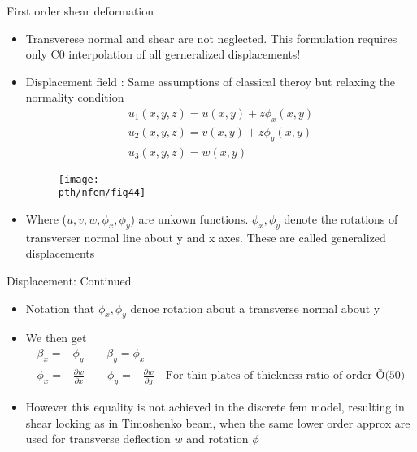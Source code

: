 	
	\begin{frame}{First order shear deformation}
		\begin{itemize}
			\item Transverese normal and shear are not neglected. This formulation requires only C0 interpolation of all gerneralized displacements!
			\item Displacement field : Same assumptions of classical theroy but relaxing the normality condition
			\begin{equation}
			\begin{aligned}
				u_1(x,y,z) = u(x,y) + z\phi_x(x,y)\\
				u_2(x,y,z) = v(x,y) + z\phi_y(x,y)\\
				u_3(x,y,z) = w(x,y) 
			\end{aligned}
			\end{equation}
			\begin{figure}
				\centering
				\texttt{[image: \\pth/nfem/fig44]}  		
			\end{figure}
			\item Where ($u,v,w,\phi_x,\phi_y$) are unkown functions. $\phi_x,\phi_y$ denote the rotations of transverser normal line about y and x axes. These are called generalized displacements
		\end{itemize}
	\end{frame}


	\begin{frame}{Displacement: Continued}
		\begin{itemize}
			\item Notation that $\phi_x,\phi_y$ denoe rotation about a transverse normal about y
			\item We then get
			\begin{equation}
			\begin{aligned}
				\beta_x = -\phi_y \qquad \beta_y = \phi_x\\
				\phi_x = - \frac{\partial w}{\partial x} \qquad 				
				\phi_y = - \frac{\partial w}{\partial y} \quad \text{For thin plates of thickness ratio of order \~ O(50)}
			\end{aligned}
			\end{equation}
			\item However this equality is not achieved in the discrete fem model, resulting in shear locking as in Timoshenko beam, when the same lower order approx are used for transverse deflection $w$ and rotation $\phi$
			
		\end{itemize}
	\end{frame}


